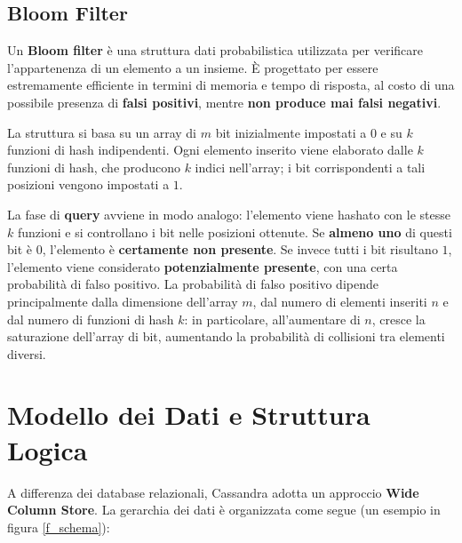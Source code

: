 \documentclass[12pt]{article}
\begin{document}
\subsection{Bloom Filter} \label{s_bloom}

Un \textbf{Bloom filter} è una struttura dati probabilistica utilizzata per verificare l'appartenenza di un elemento a un insieme. È progettato per essere estremamente efficiente in termini di memoria e tempo di risposta, al costo di una possibile presenza di \textbf{falsi positivi}, mentre \textbf{non produce mai falsi negativi}.\newline

\noindent
La struttura si basa su un array di $m$ bit inizialmente impostati a $0$ e su $k$ funzioni di hash indipendenti. Ogni elemento inserito viene elaborato dalle $k$ funzioni di hash, che producono $k$ indici nell’array; i bit corrispondenti a tali posizioni vengono impostati a $1$.\newline

\noindent
La fase di \textbf{query} avviene in modo analogo: l’elemento viene hashato con le stesse $k$ funzioni e si controllano i bit nelle posizioni ottenute. Se \textbf{almeno uno} di questi bit è $0$, l’elemento è \textbf{certamente non presente}. Se invece tutti i bit risultano $1$, l’elemento viene considerato \textbf{potenzialmente presente}, con una certa probabilità di falso positivo.
\noindent
La probabilità di falso positivo dipende principalmente dalla dimensione dell’array $m$, dal numero di elementi inseriti $n$ e dal numero di funzioni di hash $k$: in particolare, all’aumentare di $n$, cresce la saturazione dell’array di bit, aumentando la probabilità di collisioni tra elementi diversi.

\section{Modello dei Dati e Struttura Logica}
A differenza dei database relazionali, Cassandra adotta un approccio \textbf{Wide Column Store}. La gerarchia dei dati è organizzata come segue (un esempio in figura \ref{f_schema}):
\end{document}
